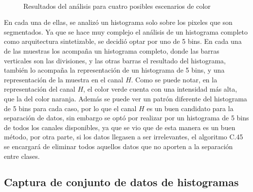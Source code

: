 \documentclass[twoside,spanish,ESP,MSc]{plantillaLabUPV}
\theoremstyle{definition}
\begin{document}
\begin{figure}[!h]
	\\
	\caption{Resultados del análisis para cuatro posibles escenarios de color}
	\label{anali}
\end{figure}

En cada una de ellas, se analizó un histograma solo sobre los pixeles que son segmentados. Ya que se hace muy complejo el análisis de un histograma completo como arquitectura sintetizable, se decidió optar por uno de 5 bins. En cada una de las muestras los acompaña un histograma completo, donde las barras verticales son las divisiones, y las otras barras el resultado del histograma, también lo acompaña la representación de un histograma de 5 bins, y una representación de la muestra en el canal $H$. Como se puede notar, en la representación del canal $H$, el color verde cuenta con una intensidad más alta, que la del color naranja. Además se puede ver un patrón diferente del histograma de 5 bins para cada caso, por lo que el canal $H$ es un buen candidato para la separación de datos, sin embargo se optó por realizar por un histograma de 5 bins de todos los canales disponibles, ya que se vio que de esta manera es un buen método, por otra parte, si los datos llegasen a ser irrelevantes, el algoritmo C.45 se encargará de eliminar todos aquellos datos que no aporten a la separación entre clases. 

\subsection{Captura de conjunto de datos de histogramas}
\end{document}
